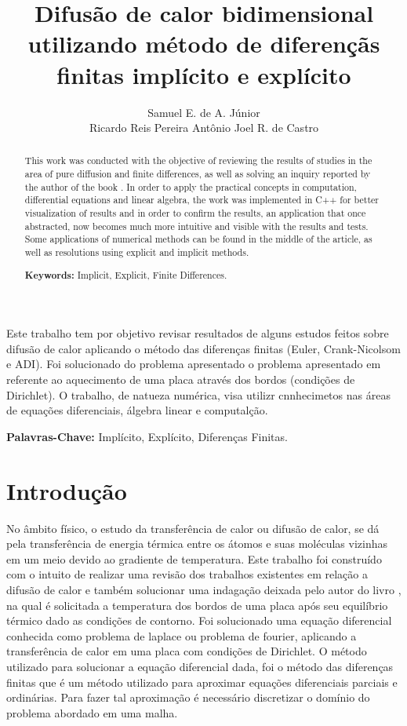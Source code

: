 \documentclass[12pt,a4paper]{article}
\title{Difusão de calor bidimensional utilizando método de diferençãs finitas implícito e explícito}
\author{Samuel E. de A. Júnior\inst{1} \\Ricardo Reis Pereira\inst{1} Antônio Joel R. de Castro\inst{1}}
\begin{document}
 

\maketitle

\begin{abstract}{
    This work was conducted with the objective of reviewing the results of studies in the area of pure diffusion and finite differences, as well as solving an inquiry reported by the author of the book \cite{boldrini1986algebra}. In order to apply the practical concepts in computation, differential equations and linear algebra, the work was implemented in C++ for better visualization of results and in order to confirm the results, an application that once abstracted, now becomes much more intuitive and visible with the results and tests. Some applications of numerical methods can be found in the middle of the article, as well as resolutions using explicit and implicit methods.
  }
  
  \textbf{Keywords:} Implicit, Explicit, Finite Differences.
\end{abstract}
     
\begin{resumo}{
    Este trabalho tem por objetivo revisar resultados de alguns estudos feitos sobre difusão de calor aplicando o método das diferenças finitas (Euler, Crank-Nicolsom e ADI). Foi  solucionado do problema apresentado o problema apresentado em  \cite{boldrini1986algebra} referente ao aquecimento de uma placa através dos bordos (condições de Dirichlet). O trabalho, de natueza numérica, visa utilizr cnnhecimetos nas áreas de equações diferenciais, álgebra linear e computalção.         
  }
  
  \textbf{Palavras-Chave:} Implícito, Explícito, Diferenças Finitas.
\end{resumo}

\section{Introdução} 

No âmbito físico, o estudo da transferência de calor ou difusão de calor, se dá pela transferência de energia térmica entre os átomos e suas moléculas vizinhas em um meio devido ao gradiente de temperatura. Este trabalho foi construído com o intuito de realizar uma revisão dos trabalhos existentes em relação a difusão de calor e também solucionar uma indagação deixada pelo autor do livro \cite{boldrini1986algebra}, na qual é solicitada a temperatura dos bordos de uma placa após seu equilíbrio térmico dado as condições de contorno. Foi solucionado uma equação diferencial conhecida como problema de laplace ou problema de fourier, aplicando a transferência de calor em uma placa com condições de Dirichlet. O método utilizado para solucionar a equação diferencial dada, foi o método das diferenças finitas que é um método utilizado para aproximar equações diferenciais parciais e ordinárias. Para fazer tal aproximação é necessário discretizar o domínio do problema abordado em uma malha.
\end{document}
